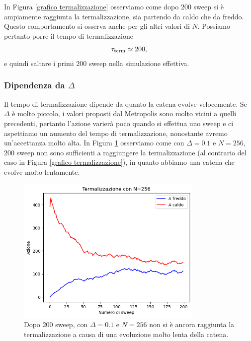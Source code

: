 \documentclass{article}
\begin{document}
In Figura \ref{grafico termalizzazione} osserviamo come dopo 200 sweep si è ampiamente raggiunta la termalizzazione, sia partendo da caldo che da freddo. Questo comportamento si osserva anche per gli altri valori di $N$. Possiamo pertanto porre il tempo di termalizzazione
\begin{equation}
    \label{tempo termalizzazione}
    \tau_{\textup{term}}\simeq 200, 
\end{equation}
e quindi saltare i primi 200 sweep nella simulazione effettiva. 

\subsubsection{Dipendenza da $\Delta$}
Il tempo di termalizzazione dipende da quanto la catena evolve velocemente. Se $\Delta$ è molto piccolo, i valori proposti dal Metropolis sono molto vicini a quelli precedenti, pertanto l'azione varierà poco quando si effettua uno sweep e ci aspettiamo un aumento del tempo di termalizzazione, nonostante avremo un'accettanza molto alta. In Figura \ref{grafico mancata termalizzazione} osserviamo come con $\Delta=0.1$ e $N=256$, 200 sweep non sono sufficienti a raggiungere la termalizzazione (al contrario del caso in Figura \ref{grafico termalizzazione}), in quanto abbiamo una catena che evolve molto lentamente.
\begin{figure}[h]
    \centering
    \includegraphics[width=0.8\textwidth]{images/thermalisation_N256_Delta01.png}
    \caption{Dopo 200 sweep, con $\Delta=0.1$ e $N=256$ non si è ancora raggiunta la termalizzazione a causa di una evoluzione molto lenta della catena.}
    \label{grafico mancata termalizzazione}
\end{figure}
\end{document}
